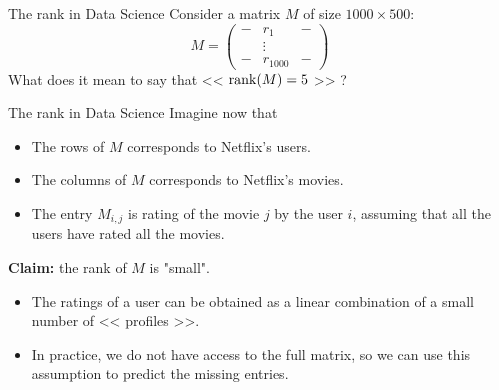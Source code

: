 \documentclass{beamer}
\begin{document}
\begin{frame}[t]{The rank in Data Science}
	\vspace{-0.3cm}
	Consider a matrix $M$ of size $1000 \times 500$:
	$$
	M=
	\begin{pmatrix}
		- & r_1 & - \\
		  & \vdots & \\
		-  & r_{1000} & -
	\end{pmatrix}
	$$
	What does it mean to say that << ${{\rm rank}}(M)=5$ >> ?
\end{frame}
\begin{frame}[t]{The rank in Data Science}
	Imagine now that
	\begin{itemize}
		\item The rows of $M$ corresponds to Netflix's users.
		\item The columns of $M$ corresponds to Netflix's movies.
		\item The entry $M_{i,j}$ is rating of the movie $j$ by the user $i$, assuming that all the users have rated all the movies.
	\end{itemize}
	\vspace{0.5cm}

	\begin{center}
	\textbf{Claim:} the rank of $M$ is "small".
	\end{center}
	\vspace{0.5cm}

	\begin{itemize}
		\item The ratings of a user can be obtained as a linear combination of a small number of << profiles >>.
		\item In practice, we do not have access to the full matrix, so we can use this assumption to predict the missing entries.
	\end{itemize}
\end{frame}
\end{document}
